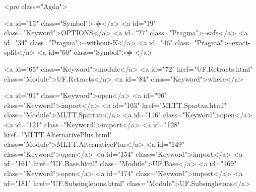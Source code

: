 <pre class="Agda">

<a id="15" class="Symbol">{-#</a> <a id="19" class="Keyword">OPTIONS</a> <a id="27" class="Pragma">--safe</a> <a id="34" class="Pragma">--without-K</a> <a id="46" class="Pragma">--exact-split</a> <a id="60" class="Symbol">#-}</a>

<a id="65" class="Keyword">module</a> <a id="72" href="UF.Retracts.html" class="Module">UF.Retracts</a> <a id="84" class="Keyword">where</a>

<a id="91" class="Keyword">open</a> <a id="96" class="Keyword">import</a> <a id="103" href="MLTT.Spartan.html" class="Module">MLTT.Spartan</a>
<a id="116" class="Keyword">open</a> <a id="121" class="Keyword">import</a> <a id="128" href="MLTT.AlternativePlus.html" class="Module">MLTT.AlternativePlus</a>
<a id="149" class="Keyword">open</a> <a id="154" class="Keyword">import</a> <a id="161" href="UF.Base.html" class="Module">UF.Base</a>
<a id="169" class="Keyword">open</a> <a id="174" class="Keyword">import</a> <a id="181" href="UF.Subsingletons.html" class="Module">UF.Subsingletons</a>

